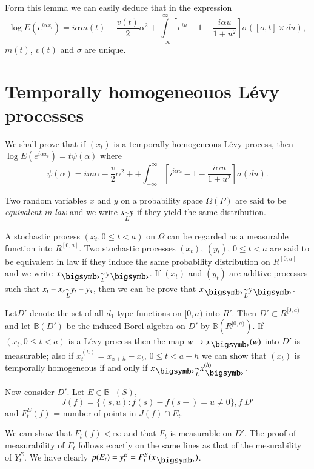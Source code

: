 Form this lemma we can easily deduce that in the expression 
$$
\log E(e^{i \alpha  x_t}) = i \alpha m(t) - \frac{v(t)}{2} \alpha^2 +
\int\limits_{- \infty}^{\infty} [e^{i u}-1- \frac{i \alpha u}{1+ u^2}]
\sigma ([o,t] \times du), 
$$ 
$m(t)$, $v(t)$ and $\sigma$ are unique.

\section{Temporally homogeneouos L\'evy processes}\label{chap4-sec4} %

We shall prove that if $(x_t)$ is a temporally homogeneous L\'evy
process, then $\log E(e^{i \alpha x_t}) = t \psi (\alpha)$ where 
$$
\psi
(\alpha ) = im \alpha - \dfrac{v}{2} \alpha^2 +  +\int_{-
  \infty}^{\infty}\left[ i^{i \alpha u}- 1 - \dfrac{i \alpha
    u}{1 + u^2}\right] \sigma (du).
$$ 

\begin{defi*}
Two  random variables $x$ and $y$ on a  probability space $\Omega
  (P)$ are said to be {\em equivalent in law} and we write $s
  {\displaystyle{\mathop{\sim}_{L}}} y$ if they yield the same distribution. 
\end{defi*}

A stochastic process $(x_t, 0 \leq  t < a)$ on $\Omega$ can be regarded
as a measurable function into $R^{[0,a]}$. Two stochastic processes
$(x_t)$, $(y_t)$, $0 \le t < a $ are said to be equivalent in law if
they induce the same probability distribution on $R^{[0,a]}$ and we
write $x_{\bigdot} \undersim{L} y_{\bigdot}$. If  $(x_t)$ and $(y_t)$
are addtive processes 
such that $x_t - x_s {\displaystyle{\mathop{\sim}_{L}}} y_t - y_s$, then we can be prove that
$x_{\bigdot} \undersim{L} y_{\bigdot}$. 

Let\pageoriginale $D'$ denote the set of all $d_1$-type functions on
$[0,a)$ into 
  $R'$. Then $D' \subset R^{[0, a)}$ and let $\mathbb{B}(D')$ be the
    induced Borel algebra on $D'$ by $\mathbb{B}(R^{[0,a)})$. If
      $(x_t, 0 \leq t < a)$ is a L\'evy process then the map $w \to
      x_{\bigdot} (w)$ 
      into $D'$ is measurable; also  if $x^{(h)}_t= x_{x+h}- x_t$, $0
      \le t < a-h$ we can show that $(x_t)$ is temporally homogeneous
      if and only if $x_{\bigdot} \undersim{L} x^{(h)}_{\bigdot}$. 
      
Now consider $D'$. Let $E \in \mathbb{B}^+ (S)$,
$$
J(f) = \{ (s,u): f(s) - f(s-) = u \neq 0 \}, f\ D'
$$ 
and $F^E_t (f)$ = number of points in $J(f) \cap E_t$.

We can show that $F_t (f) < \infty$ and that $F_t$ is measurable on
$D'$. The proof of measurability of $F_t$ follows exactly on the same
lines as that of the mesurability of $Y^E_t$. We have clearly $p
(E_t)= y^E_t = F^E_t (x_{\bigdot})$. 


